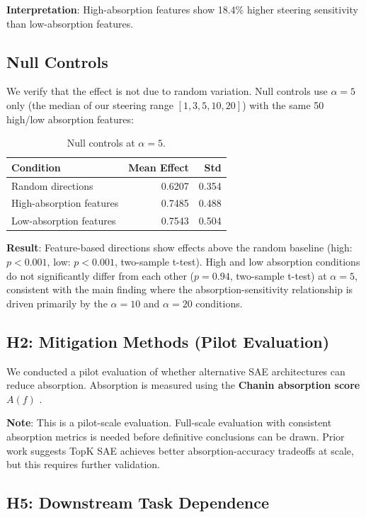 \documentclass{article}
\begin{document}
\textbf{Interpretation}: High-absorption features show 18.4\% higher steering sensitivity than low-absorption features.

\subsection{Null Controls}

We verify that the effect is not due to random variation. Null controls use $\alpha=5$ only (the median of our steering range $[1, 3, 5, 10, 20]$) with the same 50 high/low absorption features:

\begin{table}[t]
\caption{Null controls at $\alpha=5$.}
\label{tab:null-controls}
\centering
\begin{tabular}{lrr}
\toprule
Condition & Mean Effect & Std \\
\midrule
Random directions & 0.6207 & 0.354 \\
High-absorption features & 0.7485 & 0.488 \\
Low-absorption features & 0.7543 & 0.504 \\
\bottomrule
\end{tabular}
\end{table}

\textbf{Result}: Feature-based directions show effects above the random baseline (high: $p<0.001$, low: $p<0.001$, two-sample t-test). High and low absorption conditions do not significantly differ from each other ($p=0.94$, two-sample t-test) at $\alpha=5$, consistent with the main finding where the absorption-sensitivity relationship is driven primarily by the $\alpha=10$ and $\alpha=20$ conditions.

\subsection{H2: Mitigation Methods (Pilot Evaluation)}

We conducted a pilot evaluation of whether alternative SAE architectures can reduce absorption. Absorption is measured using the \textbf{Chanin absorption score $A(f)$} \citep{chanin2024spectral}.

\textbf{Note}: This is a pilot-scale evaluation. Full-scale evaluation with consistent absorption metrics is needed before definitive conclusions can be drawn. Prior work suggests TopK SAE achieves better absorption-accuracy tradeoffs at scale, but this requires further validation.

\subsection{H5: Downstream Task Dependence}
\end{document}
